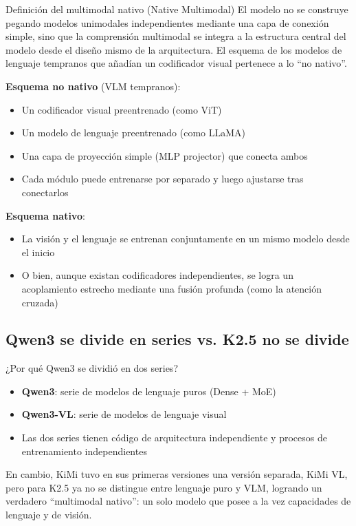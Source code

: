 \documentclass[a4paper]{article}
\begin{document}
\begin{importantbox}{Definición del multimodal nativo (Native Multimodal)}
El modelo no se construye pegando modelos unimodales independientes mediante una capa de conexión simple, sino que la comprensión multimodal se integra a la estructura central del modelo desde el diseño mismo de la arquitectura. El esquema de los modelos de lenguaje tempranos que añadían un codificador visual pertenece a lo ``no nativo''.
\end{importantbox}

\textbf{Esquema no nativo} (VLM tempranos):
\begin{itemize}
  \item Un codificador visual preentrenado (como ViT)
  \item Un modelo de lenguaje preentrenado (como LLaMA)
  \item Una capa de proyección simple (MLP projector) que conecta ambos
  \item Cada módulo puede entrenarse por separado y luego ajustarse tras conectarlos
\end{itemize}

\textbf{Esquema nativo}:
\begin{itemize}
  \item La visión y el lenguaje se entrenan conjuntamente en un mismo modelo desde el inicio
  \item O bien, aunque existan codificadores independientes, se logra un acoplamiento estrecho mediante una fusión profunda (como la atención cruzada)
\end{itemize}

\subsection{Qwen3 se divide en series vs. K2.5 no se divide}

\begin{knowledgebox}{¿Por qué Qwen3 se dividió en dos series?}
\begin{itemize}
  \item \textbf{Qwen3}: serie de modelos de lenguaje puros (Dense + MoE)
  \item \textbf{Qwen3-VL}: serie de modelos de lenguaje visual
  \item Las dos series tienen código de arquitectura independiente y procesos de entrenamiento independientes
\end{itemize}
En cambio, KiMi tuvo en sus primeras versiones una versión separada, KiMi VL, pero para K2.5 ya no se distingue entre lenguaje puro y VLM, logrando un verdadero ``multimodal nativo'': un solo modelo que posee a la vez capacidades de lenguaje y de visión.
\end{knowledgebox}
\end{document}
